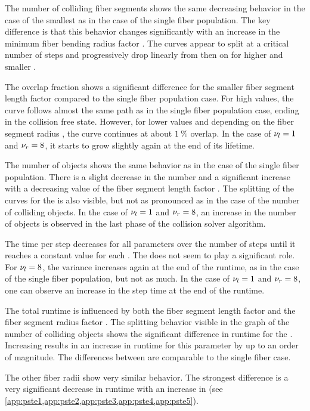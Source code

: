 %
The number of colliding fiber segments shows the same decreasing behavior in the case of the smallest \segRadiusFactor{} as in the case of the single fiber population.
The key difference is that this behavior changes significantly with an increase in the minimum fiber bending radius factor \segRadiusFactor{}.
The curves appear to split at a critical number of steps and progressively drop linearly from then on for higher \segRadiusFactor{} and smaller \segLengthFactor{}.
\par
%
The overlap fraction shows a significant difference for the smaller fiber segment length factor \segLengthFactor{} compared to the single fiber population \pfbs{} case.
For high \segLengthFactor{} values, the curve follows almost the same path as in the single fiber population case, ending in the collision free state.
However, for lower values and depending on the fiber segment radius \segRadius{}, the curve continues at about $\SI{1}{\percent}$ overlap.
In the case of $\textnormal{$\nu_{l}$} = \SI{1}{}$ and $\textnormal{$\nu_{r}$} = \SI{8}{}$, it starts to grow slightly again at the end of its lifetime.
\par
%
The number of objects shows the same behavior as in the case of the single fiber population.
There is a slight decrease in the number and a significant increase with a decreasing value of the fiber segment length factor \segLengthFactor{}.
The splitting of the curves for the \segRadiusFactor{} is also visible, but not as pronounced as in the case of the number of colliding objects.
In the case of $\textnormal{$\nu_{l}$} = \SI{1}{}$ and $\textnormal{$\nu_{r}$} = \SI{8}{}$, an increase in the number of objects is observed in the last phase of the collision solver algorithm.
\par
% 
The time per step decreases for all parameters over the number of steps until it reaches a constant value for each \segLengthFactor{}.
The \segRadiusFactor{} does not seem to play a significant role.
For $\textnormal{$\nu_{l}$}{} = \SI{8}{}$, the variance increases again at the end of the runtime, as in the case of the single fiber population, but not as much.
In the case of $\textnormal{$\nu_{l}$}{} = \SI{1}{}$ and $\textnormal{$\nu_{r}$} = \SI{8}{}$, one can observe an increase in the step time at the end of the runtime.
\par
%
The total runtime is influenced by both the fiber segment length factor \segLengthFactor{} and the fiber segment radius factor \segRadiusFactor{}.
The splitting behavior visible in the graph of the number of colliding objects shows the significant difference in runtime for the \segRadiusFactor{}.
Increasing \segRadiusFactor{} results in an increase in runtime for this parameter by up to an order of magnitude.
The differences between \segLengthFactor{} are comparable to the single fiber case.
\par
%
The other fiber radii show very similar behavior.
The strongest difference is a very significant decrease in runtime with an increase in \fiberRadiusMean{} (see \cref{app:pste1,app:pste2,app:pste3,app:pste4,app:pste5}).
%
%
%
